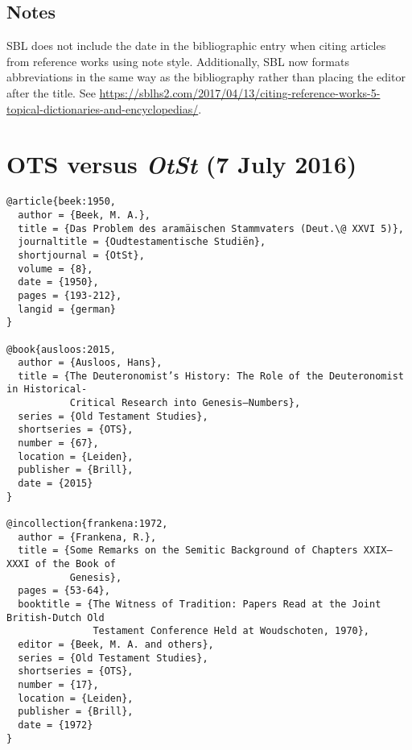 \documentclass[a4paper]{article}
\begin{document}
\begin{verbcite}
  \nocite{unger:akkad, skaist:levirat}
\end{verbcite}
\exampleabbreviations
\examplebibliography

\subsection{Notes}

SBL does not include the date in the bibliographic entry when citing articles
from reference works using note style. Additionally, SBL now formats
abbreviations in the same way as the bibliography rather than placing the
editor after the title. See
\url{https://sblhs2.com/2017/04/13/citing-reference-works-5-topical-dictionaries-and-encyclopedias/}.


\section{OTS versus \emph{OtSt} (7 July 2016)}

\begin{verbatim}
@article{beek:1950,
  author = {Beek, M. A.},
  title = {Das Problem des aramäischen Stammvaters (Deut.\@ XXVI 5)},
  journaltitle = {Oudtestamentische Studiën},
  shortjournal = {OtSt},
  volume = {8},
  date = {1950},
  pages = {193-212},
  langid = {german}
}

@book{ausloos:2015,
  author = {Ausloos, Hans},
  title = {The Deuteronomist’s History: The Role of the Deuteronomist in Historical-
           Critical Research into Genesis–Numbers},
  series = {Old Testament Studies},
  shortseries = {OTS},
  number = {67},
  location = {Leiden},
  publisher = {Brill},
  date = {2015}
}

@incollection{frankena:1972,
  author = {Frankena, R.},
  title = {Some Remarks on the Semitic Background of Chapters XXIX–XXXI of the Book of
           Genesis},
  pages = {53-64},
  booktitle = {The Witness of Tradition: Papers Read at the Joint British-Dutch Old
               Testament Conference Held at Woudschoten, 1970},
  editor = {Beek, M. A. and others},
  series = {Old Testament Studies},
  shortseries = {OTS},
  number = {17},
  location = {Leiden},
  publisher = {Brill},
  date = {1972}
}
\end{verbatim}

\begin{verbcite}
  \nocite{beek:1950, ausloos:2015, frankena:1972}
\end{verbcite}
\exampleabbreviations
\examplebibliography
{}
\end{document}
